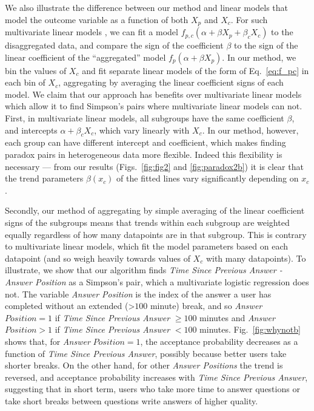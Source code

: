 
We also illustrate the difference between our method and linear models that model the outcome variable as a function of both $X_p$ and $X_c$. For such multivariate linear models \cite{Norton2015simpson}, we can fit a model $f_{p,c}(\alpha + \beta X_p + \beta_cX_c)$ to the disaggregated data, and compare the sign of the coefficient $\beta$ to the sign of the linear coefficient of the ``aggregated'' model $f_{p}(\alpha + \beta X_p)$. In our method, we bin the values of $X_c$ and fit separate linear models of the form of Eq.~\eqref{eq:f_pc} in each bin of $X_c$, aggregating by averaging the linear coefficient signs of each model. We claim that our approach has benefits over multivariate linear models which allow it to find Simpson's pairs where multivariate linear models can not. %
First, in multivariate linear models, all subgroups have the same coefficient $\beta$, and intercepts $\alpha + \beta_cX_c$, which vary linearly with $X_c$. In our method, however, each group can have different intercept and coefficient, which makes finding paradox pairs in heterogeneous data more flexible. Indeed this flexibility is necessary --- from our results (Figs.~\ref{fig:fig2} and \ref{fig:paradox2b}) it is clear that the trend parameters $\beta (x_c)$ of the fitted lines vary significantly depending on $x_c$.

Secondly, our method of aggregating by simple averaging of the linear coefficient signs of the subgroups means that trends within each subgroup are weighted equally regardless of how many datapoints are in that subgroup. This is contrary to multivariate linear models, which fit the model parameters based on each datapoint (and so weigh heavily towards values of $X_c$ with many datapoints). To illustrate, we show that our algorithm finds \textit{Time Since Previous Answer - Answer Position} as a Simpson's pair, which a multivariate logistic regression does not. The variable \textit{Answer Position} is the index of the answer a user has completed without an extended (>$100$ minute) break, and so \emph{Answer} $Position=1$ if \textit{Time Since Previous Answer}  $\ge 100$ minutes and \emph{Answer} $Position>1$ if \textit{Time Since Previous Answer} $<100$ minutes. Fig.~\eqref{fig:whynotb} shows that, for \textit{Answer} $Position=1$, the acceptance probability decreases as a function of \textit{Time Since Previous Answer}, possibly because better users take shorter breaks. On the other hand, for other \textit{Answer Positions} the trend is reversed, and acceptance probability increases with \textit{Time Since Previous Answer}, suggesting that in short term, users who take more time to answer questions or take short breaks between questions write answers of higher quality.


